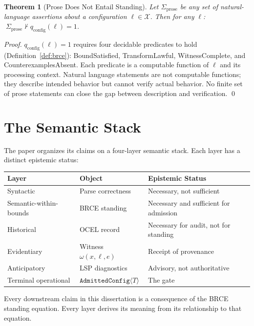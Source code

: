 \documentclass[12pt, letterpaper]{report}
\theoremstyle{plain}
\newtheorem{theorem}{Theorem}[chapter]
\theoremstyle{definition}
\theoremstyle{remark}
\newcommand{\qc}{q_{\mathrm{config}}}
\begin{document}
\begin{theorem}[Prose Does Not Entail Standing]
\label{thm:prose}
Let $\Sigma_{\mathrm{prose}}$ be any set of natural-language assertions
about a configuration $\ell \in \mathcal{X}$.
Then for any $\ell$: $\;\Sigma_{\mathrm{prose}} \not\vdash \qc(\ell) = 1$.
\end{theorem}

\begin{proof}
$\qc(\ell) = 1$ requires four decidable predicates to hold
(Definition~\ref{def:brce}): BoundSatisfied, TransformLawful,
WitnessComplete, and CounterexamplesAbsent.
Each predicate is a computable function of $\ell$ and its processing
context.
Natural language statements are not computable functions; they describe
intended behavior but cannot verify actual behavior.
No finite set of prose statements can close the gap between
description and verification. \qed
\end{proof}

\section{The Semantic Stack}

The paper organizes its claims on a four-layer semantic stack.
Each layer has a distinct epistemic status:

\begin{center}
\renewcommand{\arraystretch}{1.4}
\begin{tabular}{@{}lll@{}}
\toprule
\textbf{Layer} & \textbf{Object} & \textbf{Epistemic Status} \\
\midrule
Syntactic & Parse correctness & Necessary, not sufficient \\
Semantic-within-bounds & BRCE standing & Necessary and sufficient for admission \\
Historical & OCEL record & Necessary for audit, not for standing \\
Evidentiary & Witness $\omega(x,\ell,e)$ & Receipt of provenance \\
Anticipatory & LSP diagnostics & Advisory, not authoritative \\
Terminal operational & $\texttt{AdmittedConfig}\langle T\rangle$ & The gate \\
\bottomrule
\end{tabular}
\end{center}

Every downstream claim in this dissertation is a consequence of the BRCE
standing equation. Every layer derives its meaning from its relationship
to that equation.
\end{document}
